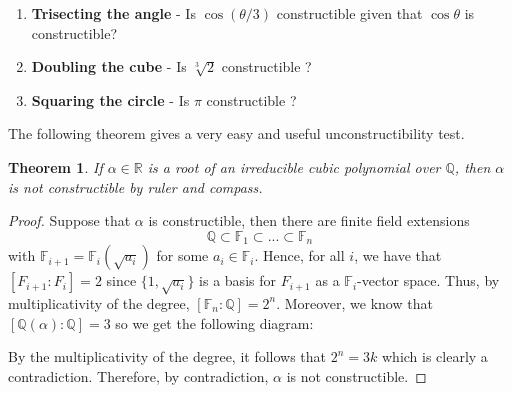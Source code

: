 \documentclass{article}
\theoremstyle{plain}
\newtheorem{theorem}{Theorem}[subsection]
\theoremstyle{definition}
\newcommand{\R}{\mathbb{R}}
\newcommand{\Q}{\mathbb{Q}}
\newcommand{\F}{\mathbb{F}}
\begin{document}
\begin{enumerate}
    \item \textbf{Trisecting the angle} - Is $\cos(\theta / 3)$ constructible given that $\cos \theta$ is constructible?
    \item \textbf{Doubling the cube} - Is $\sqrt[3]{2}$ constructible ?
    \item \textbf{Squaring the circle} - Is $\pi$ constructible ?
\end{enumerate}

The following theorem gives a very easy and useful unconstructibility test.

\begin{theorem}
\label{unconstructibility test}
    If $\alpha \in \R$ is a root of an irreducible cubic polynomial over $\Q$, then $\alpha$ is not constructible by ruler and compass.
\end{theorem}

\begin{proof}
    Suppose that $\alpha$ is constructible, then there are finite field extensions 
    $$\Q \subset \F_1 \subset ... \subset \F_n$$
    with $\F_{i+1} = \F_i(\sqrt{a_i})$ for some $a_i \in \F_i$. Hence, for all $i$, we have that $[F_{i+1} : F_i] = 2$ since $\{1, \sqrt{a_i}\}$ is a basis for $F_{i+1}$ as a $\F_i$-vector space. Thus, by multiplicativity of the degree, $[\F_n : \Q] = 2^n$. Moreover, we know that $[\Q(\alpha) : \Q] = 3$ so we get the following diagram: 
    \begin{center}
    \end{center}
    By the multiplicativity of the degree, it follows that $2^n = 3k$ which is clearly a contradiction. Therefore, by contradiction, $\alpha$ is not constructible. 
\end{proof}
\end{document}
